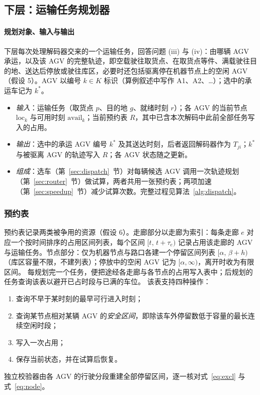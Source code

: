 \documentclass[manuscript,screen,review]{acmart}
\begin{document}
\subsection{下层：运输任务规划器}
\label{sec:planner}

\paragraph{规划对象、输入与输出}
下层每次处理解码器交来的一个运输任务，回答问题 (iii) 与 (iv)：由哪辆 AGV 承运，以及该 AGV 的完整轨迹，即空载驶往取货点、在取货点等件、满载驶往目的地、送达后停放或驶往库区，必要时还包括驱离停在机器节点上的空闲 AGV（假设 5）。AGV 以编号 $k\in K$ 标识（算例叙述中写作 A1、A2、\ldots）；选中的承运车记为 $k^{*}$。
\begin{itemize}[leftmargin=*,topsep=2pt,itemsep=1pt]
  \item \emph{输入}：运输任务（取货点 $p$、目的地 $g$、就绪时刻 $r$）；各 AGV 的当前节点 $\mathrm{loc}_k$ 与可用时刻 $\mathrm{avail}_k$；当前预约表 $R$，其中已含本次解码中此前全部任务写入的占用。
  \item \emph{输出}：选中的承运 AGV 编号 $k^{*}$ 及其送达时刻，后者返回解码器作为 $T_{ji}$；$k^{*}$ 与被驱离 AGV 的轨迹写入 $R$；各 AGV 状态随之更新。
  \item \emph{组成}：选车（第~\ref{sec:dispatch}~节）对每辆候选 AGV 调用一次轨迹规划（第~\ref{sec:router}~节）做试算，两者共用一张预约表；两项加速（第~\ref{sec:speedup}~节）减少试算次数。完整过程见算法~\ref{alg:dispatch}。
\end{itemize}

\subsubsection{预约表}
预约表记录两类被争用的资源（假设 6）。走廊部分以走廊为索引：每条走廊 $e$ 对应一个按时间排序的占用区间列表，每个区间 $[t,\,t+\tau_e)$ 记录占用该走廊的 AGV 与运输任务。节点部分：仅为机器节点与路口各建一个停留区间列表 $[\alpha,\,\beta+h)$（库区容量不限，不建列表）；停放中的空闲 AGV 记为 $[\alpha,\infty)$，离开时收为有限区间。
每规划完一个任务，便把途经各走廊与各节点的占用写入表中；后规划的任务查询该表以避开已占时段与已满的车位。
该表支持四种操作：
\begin{enumerate}[label=(\roman*),leftmargin=*,topsep=2pt,itemsep=1pt]
  \item 查询不早于某时刻的最早可行进入时刻；
  \item 查询某节点相对某辆 AGV 的\emph{安全区间}，即除该车外停留数低于容量的最长连续空闲时段；
  \item 写入一次占用；
  \item 保存当前状态，并在试算后恢复。
\end{enumerate}
独立校验器由各 AGV 的行驶分段重建全部停留区间，逐一核对式~\eqref{eq:excl} 与式~\eqref{eq:node}。
\end{document}
